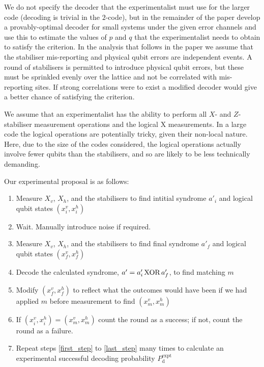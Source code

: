 We do not specify the decoder that the experimentalist must use for the larger code (decoding is trivial in the $2$-code), but in the remainder of the paper develop a provably-optimal decoder for small systems under the given error channels and use this to estimate the values of $p$ and $q$ that the experimentalist needs to obtain to satisfy the criterion. In the analysis that follows in the paper we assume that the stabiliser mis-reporting and physical qubit errors are independent events. A round of stabilisers is permitted to introduce physical qubit errors, but these must be sprinkled evenly over the lattice and not be correlated with mis-reporting sites. If strong correlations were to exist a modified decoder would give a better chance of satisfying the criterion.

We assume that an experimentalist has the ability to perform all $X$- and $Z$-stabiliser measurement operations and the logical X measurements. In a large code the logical operations are potentially tricky, given their non-local nature. Here, due to the size of the codes considered, the logical operations actually involve fewer qubits than the stabilisers, and so are likely to be less technically demanding.

Our experimental proposal is as follows:
\begin{enumerate}
  \item Measure  $X_v$, $X_h$, and the stabilisers to find intitial syndrome $a'_i$ and logical qubit states $(x^v_i, x^h_i)$\label{first_step}
  \item Wait. Manually introduce noise if required.
  \item Measure $X_v$, $X_h$, and the stabilisers to find final syndrome $a'_f$ and logical qubit states $(x^v_f, x^h_f)$
  \item Decode the calculated syndrome, $a' = a'_i \text{\,XOR\,} a'_f$, to find matching $m$ \label{decode_step}
  \item Modify $(x^v_f, x^h_f)$ to reflect what the outcomes would have been if we had applied $m$ before measurement to find $(x^v_m, x^h_m)$
  \item If $(x^v_i, x^h_i) = (x^v_m, x^h_m)$ count the round as a success; if not, count the round as a failure.\label{last_step}
  \item Repeat steps \ref{first_step} to \ref{last_step} many times to calculate an experimental successful decoding probability $P_\text{d}^\text{expt}$
\end{enumerate}

